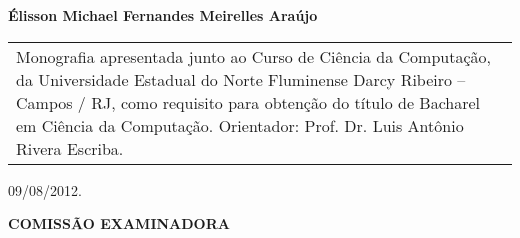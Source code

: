 \begin{folhadeaprovacao}
  \thispagestyle{empty}
  \center
  \textbf{Élisson Michael Fernandes Meirelles Araújo}
  \vfill

  \center{\textbf{\Large{\textit{\meutitulo}}}}

  \hspace*{2cm}
  \begin{table}[h!]
    \raggedleft
    \begin{tabular}{p{7cm}}
    Monografia apresentada junto ao Curso de Ciência da Computação, da Universidade Estadual do Norte Fluminense Darcy Ribeiro – Campos / RJ, como requisito para obtenção do título de Bacharel em Ciência da Computação.
    Orientador: Prof. Dr. Luis Antônio Rivera Escriba.
    \end{tabular}
  \end{table}

  \hspace*{2cm}
  \raggedright 09/08/2012.

  \center
  \textbf{COMISSÃO EXAMINADORA}

  \setlength{\ABNTsignthickness}{0.4pt} \setlength{\ABNTsignskip}{2cm}

\end{folhadeaprovacao}

